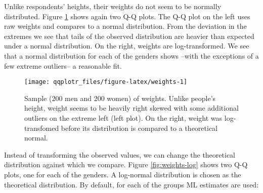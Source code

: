 Unlike respondents' heights, their weights do not seem to be normally
distributed. Figure \ref{fig:weights} shows again two Q-Q plots. The Q-Q
plot on the left uses raw weights and compares to a normal distribution.
From the deviation in the extremes we see that tails of the observed
distribution are heavier than expected under a normal distribution. On
the right, weights are log-transformed. We see that a normal
distribution for each of the genders shows --with the exceptions of a
few extreme outliers-- a reasonable fit.

\begin{Schunk}
\begin{figure}

{\centering \texttt{[image: qqplotr\_files/figure-latex/weights-1]} 

}

\caption[Sample (200 men and 200 women) of weights]{Sample (200 men and 200 women) of weights. Unlike people's height, weight seems to be heavily right skewed with some additional outliers on the extreme left (left plot). On the right, weight was log-transfomed before its distribution is compared to a theoretical normal. }\label{fig:weights}
\end{figure}
\end{Schunk}

Instead of transforming the observed values, we can change the
theoretical distribution against which we compare. Figure
\ref{fig:weights-log} shows two Q-Q plots, one for each of the genders.
A log-normal distribution is chosen as the theoretical distribution. By
default, for each of the groups ML estimates are used:

